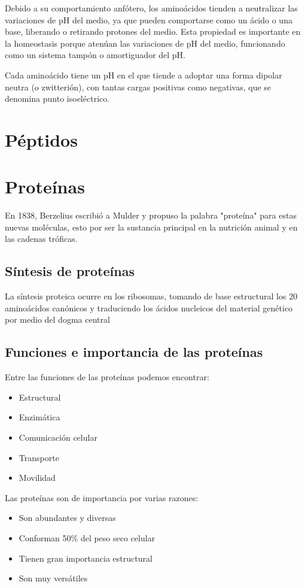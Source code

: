 Debido a su comportamiento anfótero, los aminoácidos tienden a neutralizar las variaciones de pH del medio, ya que pueden comportarse como un ácido o una base, liberando o retirando protones del medio. Esta propiedad es importante en la homeostasis porque atenúan las variaciones de pH del medio, funcionando como un sistema tampón o amortiguador del pH.

Cada aminoácido tiene un pH en el que tiende a adoptar una forma dipolar neutra (o zwitterión), con tantas cargas positivas como negativas, que se denomina punto isoeléctrico.

\section{Péptidos}



\section{Proteínas}

En 1838, Berzelius escribió a Mulder y propuso la palabra "proteína" para estas nuevas moléculas, esto por ser la sustancia principal en la nutrición animal y en las cadenas tróficas.

\subsection{Síntesis de proteínas}

La síntesis proteica ocurre en los ribosomas, tomando de base estructural los 20 aminoácidos canónicos y traduciendo los ácidos nucleicos del material genético por medio del dogma central

\subsection{Funciones e importancia de las proteínas}

Entre las funciones de las proteínas podemos encontrar:

\begin{itemize}
    \item Estructural
    \item Enzimática
    \item Comunicación celular
    \item Transporte
    \item Movilidad
\end{itemize}

Las proteínas son de importancia por varias razones:

\begin{itemize}
    \item Son abundantes y diversas
    \item Conforman 50\% del peso seco celular
    \item Tienen gran importancia estructural
    \item Son muy versátiles
\end{itemize}